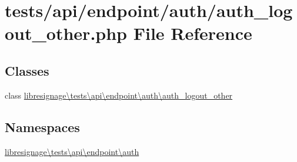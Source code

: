 \hypertarget{tests_2api_2endpoint_2auth_2auth__logout__other_8php}{}\section{tests/api/endpoint/auth/auth\+\_\+logout\+\_\+other.php File Reference}
\label{tests_2api_2endpoint_2auth_2auth__logout__other_8php}
\subsection*{Classes}
\begin{DoxyCompactItemize}
\item 
class \hyperlink{classlibresignage_1_1tests_1_1api_1_1endpoint_1_1auth_1_1auth__logout__other}{libresignage\textbackslash{}tests\textbackslash{}api\textbackslash{}endpoint\textbackslash{}auth\textbackslash{}auth\+\_\+logout\+\_\+other}
\end{DoxyCompactItemize}
\subsection*{Namespaces}
\begin{DoxyCompactItemize}
\item 
 \hyperlink{namespacelibresignage_1_1tests_1_1api_1_1endpoint_1_1auth}{libresignage\textbackslash{}tests\textbackslash{}api\textbackslash{}endpoint\textbackslash{}auth}
\end{DoxyCompactItemize}

